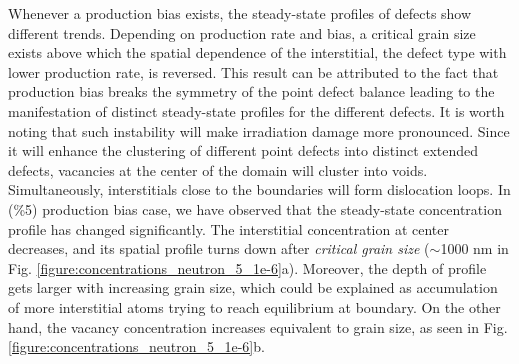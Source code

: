 \documentclass[a4paper]{article}
\begin{document}
    \newpage
    Whenever a production bias exists, the steady-state profiles of defects show different trends. Depending on production rate and bias, a critical grain size exists above which the spatial dependence of the interstitial, the defect type with lower production rate, is reversed. This result can be attributed to the fact that production bias breaks the symmetry of the point defect balance leading to the manifestation of distinct steady-state profiles for the different defects. It is worth noting that such instability will make irradiation damage more pronounced.
    Since it will enhance the clustering of different point defects into distinct extended defects, vacancies at the center of the domain will cluster into voids. Simultaneously, interstitials close to the boundaries will form dislocation loops.
     In (\%5) production bias case, we have observed that the steady-state concentration profile has changed significantly. The interstitial concentration at center decreases, and its spatial profile turns down after \textit{critical grain size} (${\sim}$1000 nm in Fig. \ref{figure:concentrations_neutron_5_1e-6}a). Moreover, the depth of profile gets larger with increasing grain size, which could be explained as accumulation of more interstitial atoms trying to reach equilibrium at boundary. On the other hand, the vacancy concentration increases equivalent to grain size, as seen in Fig. \ref{figure:concentrations_neutron_5_1e-6}b.\\
\end{document}
